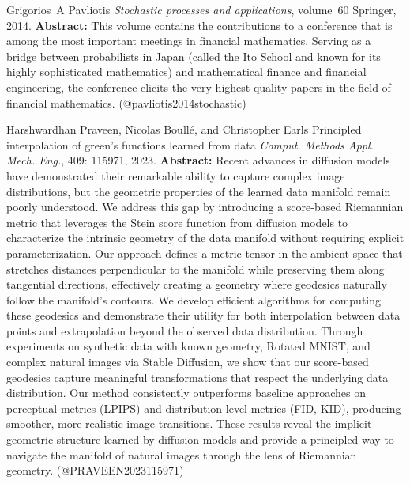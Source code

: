 \documentclass{article} %
\begin{document}
\begin{thebibliography}{}
 Grigorios~A Pavliotis \newblock \emph{Stochastic processes and applications}, volume~60 \newblock Springer, 2014. \newblock \textbf{Abstract:} This volume contains the contributions to a conference that is among the most important meetings in financial mathematics. Serving as a bridge between probabilists in Japan (called the Ito School and known for its highly sophisticated mathematics) and mathematical finance and financial engineering, the conference elicits the very highest quality papers in the field of financial mathematics. \newblock (@pavliotis2014stochastic)

 Harshwardhan Praveen, Nicolas Boullé, and Christopher Earls \newblock Principled interpolation of green’s functions learned from data \newblock \emph{Comput. Methods Appl. Mech. Eng.}, 409: 115971, 2023. \newblock \textbf{Abstract:} Recent advances in diffusion models have demonstrated their remarkable ability to capture complex image distributions, but the geometric properties of the learned data manifold remain poorly understood. We address this gap by introducing a score-based Riemannian metric that leverages the Stein score function from diffusion models to characterize the intrinsic geometry of the data manifold without requiring explicit parameterization. Our approach defines a metric tensor in the ambient space that stretches distances perpendicular to the manifold while preserving them along tangential directions, effectively creating a geometry where geodesics naturally follow the manifold's contours. We develop efficient algorithms for computing these geodesics and demonstrate their utility for both interpolation between data points and extrapolation beyond the observed data distribution. Through experiments on synthetic data with known geometry, Rotated MNIST, and complex natural images via Stable Diffusion, we show that our score-based geodesics capture meaningful transformations that respect the underlying data distribution. Our method consistently outperforms baseline approaches on perceptual metrics (LPIPS) and distribution-level metrics (FID, KID), producing smoother, more realistic image transitions. These results reveal the implicit geometric structure learned by diffusion models and provide a principled way to navigate the manifold of natural images through the lens of Riemannian geometry. \newblock (@PRAVEEN2023115971)


\end{thebibliography}
\end{document}
